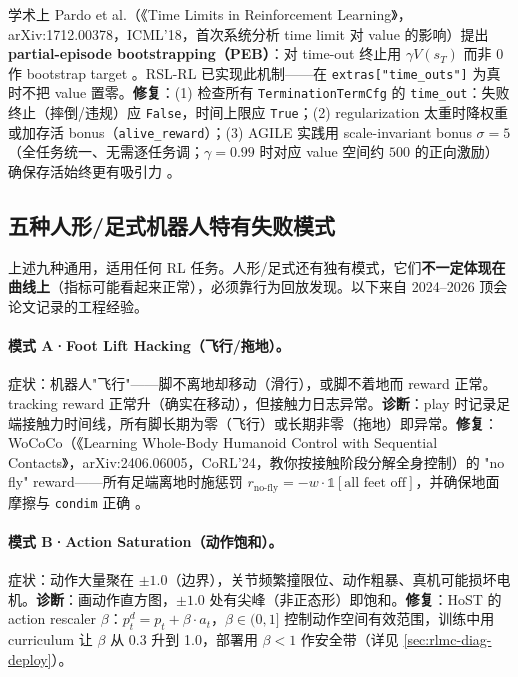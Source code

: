 学术上 Pardo et al.（《Time Limits in Reinforcement Learning》，arXiv:1712.00378，ICML'18，首次系统分析 time limit 对 value 的影响）提出 \textbf{partial-episode bootstrapping（PEB）}：对 time-out 终止用 $\gamma V(s_T)$ 而非 $0$ 作 bootstrap target \cite{pardo2018timelimits}。RSL-RL 已实现此机制——在 \verb|extras["time_outs"]| 为真时不把 value 置零。\textbf{修复}：(1) 检查所有 \verb|TerminationTermCfg| 的 \verb|time_out|：失败终止（摔倒/违规）应 \verb|False|，时间上限应 \verb|True|；(2) regularization 太重时降权重或加存活 bonus（\verb|alive_reward|）；(3) AGILE 实践用 scale-invariant bonus $\sigma=5$（全任务统一、无需逐任务调；$\gamma=0.99$ 时对应 value 空间约 $500$ 的正向激励）确保存活始终更有吸引力 \cite{nvidia2026agile}。

\subsection{五种人形/足式机器人特有失败模式}

上述九种通用，适用任何 RL 任务。人形/足式还有独有模式，它们\textbf{不一定体现在曲线上}（指标可能看起来正常），必须靠行为回放发现。以下来自 2024--2026 顶会论文记录的工程经验。

\paragraph{模式 A·Foot Lift Hacking（飞行/拖地）。}症状：机器人"飞行"——脚不离地却移动（滑行），或脚不着地而 reward 正常。tracking reward 正常升（确实在移动），但接触力日志异常。\textbf{诊断}：play 时记录足端接触力时间线，所有脚长期为零（飞行）或长期非零（拖地）即异常。\textbf{修复}：WoCoCo（《Learning Whole-Body Humanoid Control with Sequential Contacts》，arXiv:2406.06005，CoRL'24，教你按接触阶段分解全身控制）的 "no fly" reward——所有足端离地时施惩罚 $r_{\text{no-fly}}=-w\cdot\mathbb{1}[\text{all feet off}]$，并确保地面摩擦与 \verb|condim| 正确 \cite{zhang2024wococo}。

\paragraph{模式 B·Action Saturation（动作饱和）。}症状：动作大量聚在 $\pm 1.0$（边界），关节频繁撞限位、动作粗暴、真机可能损坏电机。\textbf{诊断}：画动作直方图，$\pm 1.0$ 处有尖峰（非正态形）即饱和。\textbf{修复}：HoST 的 action rescaler $\beta$：$p_t^d = p_t + \beta\cdot a_t$，$\beta\in(0,1]$ 控制动作空间有效范围，训练中用 curriculum 让 $\beta$ 从 0.3 升到 1.0，部署用 $\beta<1$ 作安全带（详见 \cref{sec:rlmc-diag-deploy}）\cite{huang2025host}。

